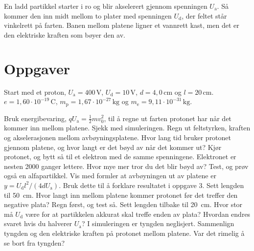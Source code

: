 \documentclass[11pt]{article}
\begin{document}

En ladd partikkel starter i ro og blir akselerert gjennom spenningen $U_{\mathrm{a}}$. Så kommer den inn midt mellom to plater med spenningen $U_{\mathrm{d}}$, der feltet står vinkelrett på farten. Banen mellom platene ligner et vannrett kast, men det er den elektriske kraften som bøyer den av.

\section*{Oppgaver}

Start med et proton, $U_{\mathrm{a}} = 400\,\mathrm{V}$, $U_{\mathrm{d}} = 10\,\mathrm{V}$, $d = 4{,}0\,\mathrm{cm}$ og $l = 20\,\mathrm{cm}$. $e = 1{,}60 \cdot 10^{-19}\,\mathrm{C}$, $m_{\mathrm{p}} = 1{,}67 \cdot 10^{-27}\,\mathrm{kg}$ og $m_{\mathrm{e}} = 9{,}11 \cdot 10^{-31}\,\mathrm{kg}$.

\begin{oppgaveliste}
\oppgave {}Bruk energibevaring, $qU_{\mathrm{a}} = \tfrac{1}{2}mv_{0}^{2}$, til å regne ut farten protonet har når det kommer inn mellom platene. Sjekk med simuleringen.
\svar
\oppgave {}Regn ut feltstyrken, kraften og akselerasjonen mellom avbøyningsplatene. Hvor lang tid bruker protonet gjennom platene, og hvor langt er det bøyd av når det kommer ut?
\svar
\oppgave {}Kjør protonet, og bytt så til et elektron med de samme spenningene. Elektronet er nesten 2000 ganger lettere. Hvor mye mer tror du det blir bøyd av? Test, og prøv også en alfapartikkel.
\svar
\oppgave {}Vis med formler at avbøyningen ut av platene er $y = U_{\mathrm{d}} l^{2} / (4 d U_{\mathrm{a}})$. Bruk dette til å forklare resultatet i oppgave 3.
\svar
\oppgave {}Sett lengden til 50~cm. Hvor langt inn mellom platene kommer protonet før det treffer den negative plata? Regn først, og test så.
\svar
\oppgave {}Sett lengden tilbake til 20~cm. Hvor stor må $U_{\mathrm{d}}$ være for at partikkelen akkurat skal treffe enden av plata? Hvordan endres svaret hvis du halverer $U_{\mathrm{a}}$?
\svar
\oppgave {}I simuleringen er tyngden neglisjert. Sammenlign tyngden og den elektriske kraften på protonet mellom platene. Var det rimelig å se bort fra tyngden?
\svar
\end{oppgaveliste}
\end{document}
